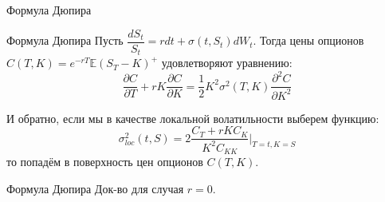 \documentclass{beamer}
\begin{document}
\begin{frame}{Формула Дюпира}
    \begin{block}{Формула Дюпира}
        Пусть $\dfrac{dS_t}{S_t} = r dt + \sigma(t, S_t) dW_t$. Тогда цены опционов $C(T, K) = e^{-rT}\mathbb{E} (S_T - K)^+$ удовлетворяют уравнению:
        $$
            \dfrac{\partial C}{\partial T} + rK\dfrac{\partial C}{\partial K} = \dfrac{1}{2} K^2 \sigma^2(T, K) \dfrac{\partial^2 C}{\partial K^2} 
        $$
    \end{block}

    И обратно, если мы в качестве локальной волатильности выберем функцию:
    $$
        \sigma_{loc}^2(t, S) =2 \dfrac{C_T + rKC_K}{K^2 C_{KK} } |_{T=t, K=S}
    $$то попадём в поверхность цен опционов $C(T, K)$. 
\end{frame}


\begin{frame}{Формула Дюпира}
    Док-во для случая $r=0$. 
    \begin{itemize}
    \end{itemize}
\end{frame}
\end{document}
